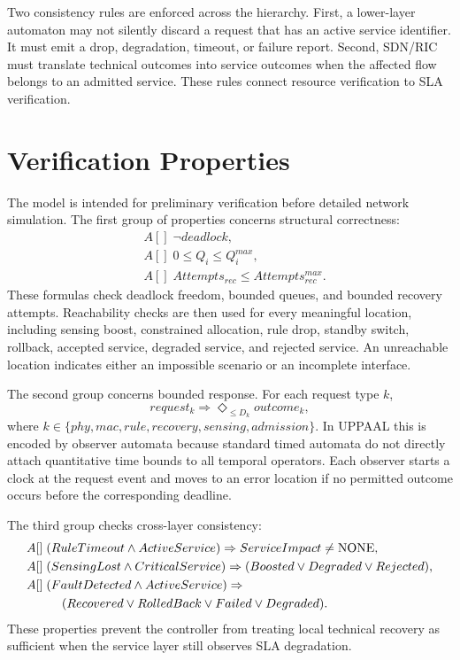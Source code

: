 \documentclass[runningheads]{llncs}
\begin{document}
Two consistency rules are enforced across the hierarchy. First, a lower-layer automaton may not silently discard a request that has an active service identifier. It must emit a drop, degradation, timeout, or failure report. Second, SDN/RIC must translate technical outcomes into service outcomes when the affected flow belongs to an admitted service. These rules connect resource verification to SLA verification.

\section{Verification Properties}

The model is intended for preliminary verification before detailed network simulation. The first group of properties concerns structural correctness:
\begin{align}
&A[]\;\neg deadlock,\label{eq:deadlock}\\
&A[]\;0\le Q_i\le Q_i^{max},\label{eq:queue}\\
&A[]\;Attempts_{rec}\le Attempts_{rec}^{max}.\label{eq:attempts}
\end{align}
These formulas check deadlock freedom, bounded queues, and bounded recovery attempts. Reachability checks are then used for every meaningful location, including sensing boost, constrained allocation, rule drop, standby switch, rollback, accepted service, degraded service, and rejected service. An unreachable location indicates either an impossible scenario or an incomplete interface.

The second group concerns bounded response. For each request type $k$,
\begin{equation}
request_k\Rightarrow\Diamond_{\le D_k} outcome_k,
\end{equation}
where $k\in\{phy,mac,rule,recovery,sensing,admission\}$. In UPPAAL this is encoded by observer automata because standard timed automata do not directly attach quantitative time bounds to all temporal operators. Each observer starts a clock at the request event and moves to an error location if no permitted outcome occurs before the corresponding deadline.

The third group checks cross-layer consistency:
\begin{align}
&A[]\;(RuleTimeout\wedge ActiveService)
   \Rightarrow ServiceImpact\ne \mathrm{NONE},\label{eq:ruleimpact}\\
&A[]\;(SensingLost\wedge CriticalService)
   \Rightarrow (Boosted\vee Degraded\vee Rejected),\label{eq:sensingimpact}\\
&A[]\;(FaultDetected\wedge ActiveService)\Rightarrow \notag\\
&\hspace{10mm}(Recovered\vee RolledBack\vee Failed\vee Degraded).\label{eq:faultimpact}
\end{align}
These properties prevent the controller from treating local technical recovery as sufficient when the service layer still observes SLA degradation.
\end{document}
